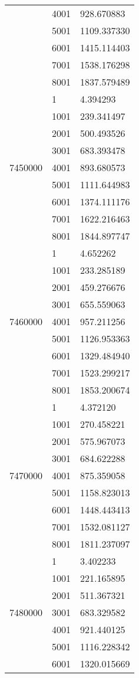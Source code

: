 \begin{table}[htb!]
\begin{tabular}{lll}
 & 4001 & 928.670883 \\
 & 5001 & 1109.337330 \\
 & 6001 & 1415.114403 \\
 & 7001 & 1538.176298 \\
 & 8001 & 1837.579489 \\
\multirow[c]{9}{*}{7450000} & 1 & 4.394293 \\
 & 1001 & 239.341497 \\
 & 2001 & 500.493526 \\
 & 3001 & 683.393478 \\
 & 4001 & 893.680573 \\
 & 5001 & 1111.644983 \\
 & 6001 & 1374.111176 \\
 & 7001 & 1622.216463 \\
 & 8001 & 1844.897747 \\
\multirow[c]{9}{*}{7460000} & 1 & 4.652262 \\
 & 1001 & 233.285189 \\
 & 2001 & 459.276676 \\
 & 3001 & 655.559063 \\
 & 4001 & 957.211256 \\
 & 5001 & 1126.953363 \\
 & 6001 & 1329.484940 \\
 & 7001 & 1523.299217 \\
 & 8001 & 1853.200674 \\
\multirow[c]{9}{*}{7470000} & 1 & 4.372120 \\
 & 1001 & 270.458221 \\
 & 2001 & 575.967073 \\
 & 3001 & 684.622288 \\
 & 4001 & 875.359058 \\
 & 5001 & 1158.823013 \\
 & 6001 & 1448.443413 \\
 & 7001 & 1532.081127 \\
 & 8001 & 1811.237097 \\
\multirow[c]{9}{*}{7480000} & 1 & 3.402233 \\
 & 1001 & 221.165895 \\
 & 2001 & 511.367321 \\
 & 3001 & 683.329582 \\
 & 4001 & 921.440125 \\
 & 5001 & 1116.228342 \\
 & 6001 & 1320.015669 \\

\end{tabular}
\end{table}
